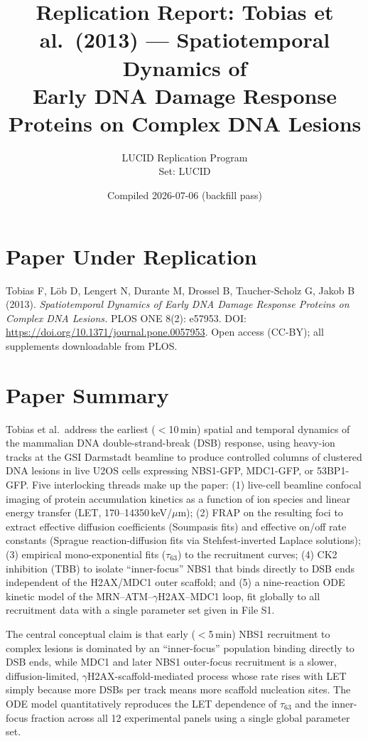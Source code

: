 \documentclass[11pt]{article}
\title{Replication Report: Tobias et al.\ (2013) --- Spatiotemporal Dynamics of\\
Early DNA Damage Response Proteins on Complex DNA Lesions}
\author{LUCID Replication Program\\Set: LUCID}
\date{Compiled 2026-07-06 (backfill pass)}
\begin{document}
\maketitle

\section*{Paper Under Replication}

Tobias F, L\"ob D, Lengert N, Durante M, Drossel B, Taucher-Scholz G, Jakob B (2013).
\emph{Spatiotemporal Dynamics of Early DNA Damage Response Proteins on Complex DNA Lesions.}
PLOS ONE 8(2): e57953.
DOI: \url{https://doi.org/10.1371/journal.pone.0057953}.
Open access (CC-BY); all supplements downloadable from PLOS.

\section{Paper Summary}

Tobias et al.\ address the earliest ($<$10\,min) spatial and temporal dynamics of the mammalian DNA
double-strand-break (DSB) response, using heavy-ion tracks at the GSI Darmstadt beamline to
produce controlled columns of clustered DNA lesions in live U2OS cells expressing NBS1-GFP,
MDC1-GFP, or 53BP1-GFP. Five interlocking threads make up the paper:
(1) live-cell beamline confocal imaging of protein accumulation kinetics as a function of ion
species and linear energy transfer (LET, 170--14350\,keV/$\mu$m);
(2) FRAP on the resulting foci to extract effective diffusion coefficients
(Soumpasis fits) and effective on/off rate constants (Sprague reaction-diffusion fits via
Stehfest-inverted Laplace solutions);
(3) empirical mono-exponential fits ($\tau_{63}$) to the recruitment curves;
(4) CK2 inhibition (TBB) to isolate ``inner-focus'' NBS1 that binds directly to DSB ends
independent of the H2AX/MDC1 outer scaffold; and
(5) a nine-reaction ODE kinetic model of the MRN--ATM--$\gamma$H2AX--MDC1 loop, fit globally to
all recruitment data with a single parameter set given in File S1.

The central conceptual claim is that early ($<$5\,min) NBS1 recruitment to complex lesions is
dominated by an ``inner-focus'' population binding directly to DSB ends, while MDC1 and later NBS1
outer-focus recruitment is a slower, diffusion-limited, $\gamma$H2AX-scaffold-mediated process
whose rate rises with LET simply because more DSBs per track means more scaffold nucleation sites.
The ODE model quantitatively reproduces the LET dependence of $\tau_{63}$ and the inner-focus
fraction across all 12 experimental panels using a single global parameter set.
\end{document}
